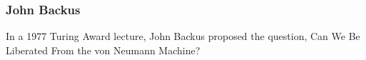 \begin{frame}
\frametitle{John Backus}
\begin{center}
 In a 1977 Turing Award lecture, John Backus proposed the question, Can We Be Liberated From the von Neumann Machine?
\end{center}
\end{frame}
